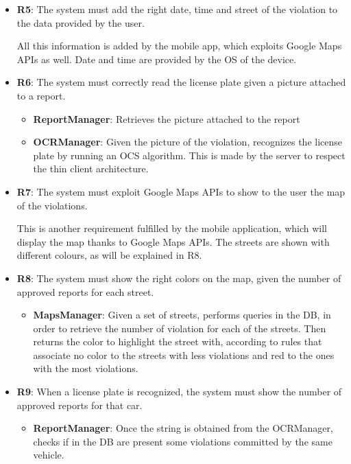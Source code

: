 \documentclass[12pt,a4paper]{report}
\begin{document}
\begin{itemize}
	\item\textbf{R5}: The system must add the right date, time and street of the violation to the data provided by the user.

		All this information is added by the mobile app, which exploits Google Maps APIs as well. Date and time are provided by the OS of the device.
		
	\item\textbf{R6}: The system must correctly read the license plate given a picture attached to a report.
		\begin{itemize}
		\item\textbf{ReportManager}: Retrieves the picture attached to the report
		\item\textbf{OCRManager}: Given the picture of the violation, recognizes the license plate by running an OCS algorithm. This is made by the server to
		respect the thin client architecture.
		\end{itemize}	
		
	\item\textbf{R7}: The system must exploit Google Maps APIs to show to the user the map of the violations.

		This is another requirement fulfilled by the mobile application, which will display the map thanks to Google Maps APIs. The streets are shown with different
		colours, as will be explained in R8.
			
	\item\textbf{R8}: The system must show the right colors on the map, given the number of approved reports for each street.
		\begin{itemize}
		\item\textbf{MapsManager}: Given a set of streets, performs queries in the DB, in order to retrieve the number of violation for each of the streets. Then returns
		the color to highlight the street with, according to rules that associate no color to the streets with less violations and red to the ones with the most violations.
		\end{itemize}
			
	\item\textbf{R9}: When a license plate is recognized, the system must show the number of approved reports for that car.
		\begin{itemize}
		\item\textbf{ReportManager}: Once the string is obtained from the OCRManager, checks if in the DB are present some violations committed by the same vehicle. 
		\end{itemize}
			

\end{itemize}
\end{document}
